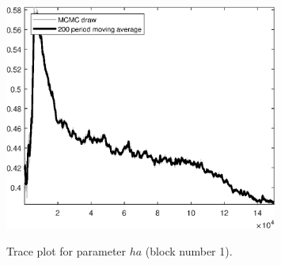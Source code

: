 \begin{figure}[H]
\centering
  \includegraphics[width=0.8\textwidth]{BRS_sectoral_wo_gmf/graphs/TracePlot_ha_blck_1}\\
    \caption{Trace plot for parameter ${ha}$ (block number 1).}
\end{figure}
